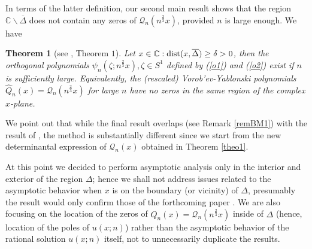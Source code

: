 \documentclass[10pt,oneside,reqno]{amsart}
\numberwithin{equation}{section}
\newtheorem{theorem}{Theorem}[section]
\def\bth{\begin{theorem}}
\def\et{\end{theorem}}
\def\wh{\widehat}
\def\eqref#1{(\ref{#1})}
\begin{document}
In terms of the latter definition, our second main result shows that the region $\mathbb{C}\backslash\overline{\Delta}$ does not contain any zeros of $\mathcal{Q}_n(n^{\frac{2}{3}}x)$, provided $n$ is large enough. We have
\bth[see \cite{BM}, Theorem $1$]\label{theo2} Let $x\in\mathbb{C}:\textnormal{dist}(x,\overline{\Delta})\geq\delta>0$, then the orthogonal polynomials $\psi_n(\zeta;n^{\frac{2}{3}}x),\zeta\in S^1$ defined by \eqref{o1} and \eqref{o2} exist if
$n$ is sufficiently large. Equivalently, the (rescaled) Vorob'ev-Yablonski polynomials $\wh Q_n(x)= \mathcal{Q}_n(n^{\frac{2}{3}}x)$ for large $n$ have no zeros in the same region of the complex $x$-plane.
\et

We point out that while the final result overlaps (see Remark \ref{remBM1}) with the result of \cite{BM}, the method is substantially different since we start from the new determinantal expression of $\mathcal Q_n(x)$ obtained in Theorem \ref{theo1}.\smallskip

At this point we decided to perform asymptotic analysis only in the interior and exterior of the region $\Delta$; hence we shall not address issues related to the asymptotic behavior when $x$ is on the boundary (or vicinity) of $\Delta$, presumably the result would only confirm those of the forthcoming paper \cite{BM2}.
We are also focusing on the location of the zeros of $\wh Q_n(x)= \mathcal Q_n( n^\frac 23 x)$ inside of $\Delta$ (hence, location of the poles of $u(x;n)$) rather than the asymptotic behavior of the rational solution $u(x;n)$ itself, not to unnecessarily duplicate the results.\smallskip
\end{document}
